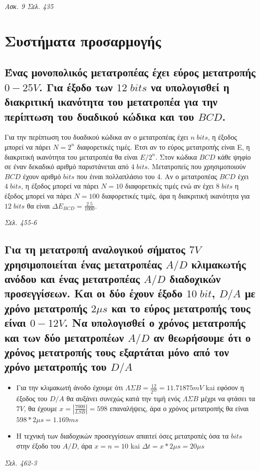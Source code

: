 \documentclass{article}
\begin{document}
\emph{Ασκ. 9 Σελ. 435}

\section{Συστήματα προσαρμογής}
\subsection{Ένας μονοπολικός μετατροπέας έχει εύρος μετατροπής $0-25V$. Για έξοδο των $12\; bits$ να υπολογισθεί η διακριτική ικανότητα του μετατροπέα για την περίπτωση 
του δυαδικού κώδικα και του $BCD$.}
Για την περίπτωση του δυαδικού κώδικα αν ο μετατροπέας έχει $n\; bits$, η έξοδος μπορεί να πάρει $Ν=2^n$ διαφορετικές τιμές. Έτσι αν το εύρος μετατροπής είναι Ε, η διακριτική
ικανότητα του μετατροπέα θα είναι $E/2^n$. Στον κώδικα $BCD$ κάθε ψηφίο σε έναν δεκαδικό αριθμό παριστάνεται από $4\; bits$. Μετατροπείς που χρησιμοποιούν $BCD$ 
έχουν αριθμό $bits$ που έιναι πολλαπλάσιο του 4. Αν ο μετατροπέας $BCD$ έχει $4\; bits$, η έξοδος μπορεί να πάρει $N=10$ διαφορετικές τιμές ενώ αν έχει $8\; bits$ η
έξοδος μπορεί να πάρει $Ν=100$ διαφορετικές τιμές, άρα η διακριτική ικανότητα για $12\; bits$ θα είναι $\Delta E_{BCD}=\frac{2.5}{1000}$.

\emph{Σελ. 455-6}

\subsection{Για τη μετατροπή αναλογικού σήματος $7V$ χρησιμοποιείται ένας μετατροπέας $A/D$ κλιμακωτής ανόδου και ένας μετατροπέας $Α/D$ διαδοχικών προσεγγίσεων. Και οι δύο έχουν έξοδο 
$10\; bit$, $D/A$ με χρόνο μετατροπής $2\mu s$ και το εύρος μετατροπής τους είναι $0-12V$. Να υπολογισθεί ο χρόνος μετατροπής και των δύο μετατροπέων $A/D$ αν θεωρήσουμε ότι ο χρόνος
μετατροπής τους εξαρτάται μόνο από τον χρόνο μετατροπής του $D/A$}
    
\begin{itemize}
    \item Για την κλιμακωτή άνοδο έχουμε ότι $ΛΣΒ = \frac{12}{2^{10}} = 11.71875mV$ kai εφόσον η έξοδος του $D/A$ θα αυξάνει συνεχώς κατά την τιμή ενός $ΛΣΒ$ μέχρι να φτάσει τα $7V$, 
        θα έχουμε $x = |\frac{7000}{LSB}| = 598$ επαναλήψεις, άρα ο χρόνος μετατροπής θα είναι $598*2\mu s = 1.169ms$
    \item Η τεχνική των διαδοχικών προσεγγίσεων απαιτεί όσες μετατροπές όσα τα $bits$ στην έξοδο του $A/D$, άρα $x = n = 10$ kai $\Delta t = x * 2\mu s = 20\mu s$
\end{itemize}
\emph{Σελ. 462-3}
\end{document}
